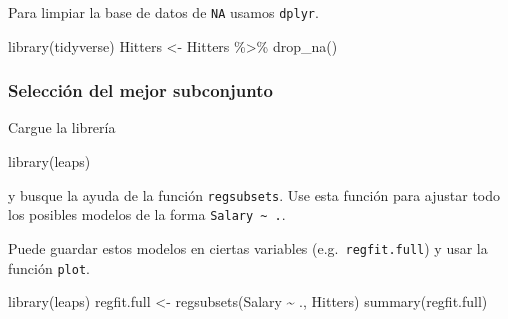 \documentclass[
  12pt,
]{book}
\newenvironment{Shaded}{\begin{snugshade}}{\end{snugshade}}
\newcommand{\FunctionTok}[1]{\textcolor[rgb]{0.00,0.00,0.00}{#1}}
\newcommand{\NormalTok}[1]{#1}
\newcommand{\OtherTok}[1]{\textcolor[rgb]{0.56,0.35,0.01}{#1}}
\newcommand{\SpecialCharTok}[1]{\textcolor[rgb]{0.00,0.00,0.00}{#1}}
\theoremstyle{definition}
\theoremstyle{definition}
\theoremstyle{definition}
\theoremstyle{remark}
\begin{document}
Para limpiar la base de datos de \texttt{NA} usamos \texttt{dplyr}.

\begin{Shaded}
\begin{Highlighting}[]
\FunctionTok{library}\NormalTok{(tidyverse)}
\NormalTok{Hitters }\OtherTok{\textless{}{-}}\NormalTok{ Hitters }\SpecialCharTok{\%\textgreater{}\%} \FunctionTok{drop\_na}\NormalTok{()}
\end{Highlighting}
\end{Shaded}

\hypertarget{selecciuxf3n-del-mejor-subconjunto}{%
\subsubsection{Selección del mejor subconjunto}\label{selecciuxf3n-del-mejor-subconjunto}}

Cargue la librería

\begin{Shaded}
\begin{Highlighting}[]
\FunctionTok{library}\NormalTok{(leaps)}
\end{Highlighting}
\end{Shaded}

y busque la ayuda de la función \texttt{regsubsets}. Use esta función para ajustar todo los posibles modelos de la forma \texttt{Salary\ \textasciitilde{}\ .}.

Puede guardar estos modelos en ciertas variables (e.g.~\texttt{regfit.full}) y usar la función \texttt{plot}.

\begin{Shaded}
\begin{Highlighting}[]
\FunctionTok{library}\NormalTok{(leaps)}
\NormalTok{regfit.full }\OtherTok{\textless{}{-}} \FunctionTok{regsubsets}\NormalTok{(Salary }\SpecialCharTok{\textasciitilde{}}\NormalTok{ ., Hitters)}
\FunctionTok{summary}\NormalTok{(regfit.full)}
\end{Highlighting}
\end{Shaded}
\end{document}

